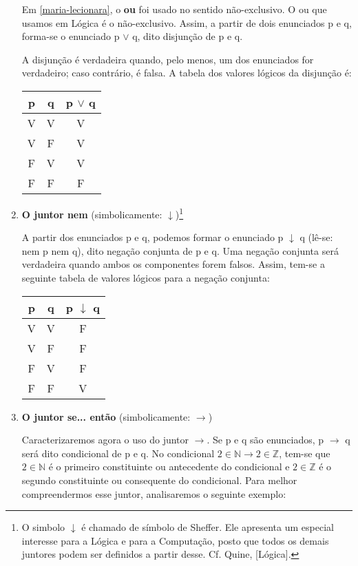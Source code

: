 \begin{enumerate}[label=\textbf{(\arabic*)}]
    Em \ref{maria-lecionara}, o \textbf{ou} foi usado no sentido não-exclusivo.
    O ou que usamos em Lógica é o não-exclusivo.
    Assim, a partir de dois enunciados p e q, forma-se o enunciado p $\lor$ q, dito disjunção de p e q.

    A disjunção é verdadeira quando, pelo menos, um dos enunciados for verdadeiro; caso contrário, é falsa.
    A tabela dos valores lógicos da disjunção é:

    \begin{center}
        \begin{tabular}{c c c}
            p & q & p $\lor$ q \\ \hline
            V & V & V \\
            V & F & V \\
            F & V & V \\
            F & F & F
        \end{tabular}
    \end{center}

    \pagebreak

    \item \textbf{O juntor nem} (simbolicamente: $\downarrow$)\footnote{O simbolo $\downarrow$ é chamado de  símbolo de Sheffer.
    Ele apresenta um especial interesse para a  Lógica e para a Computação, posto que todos os demais juntores podem ser definidos a partir desse. Cf. Quine, [Lógica].}

    A partir dos enunciados p e q, podemos formar o enunciado p $\downarrow$ q  (lê-se: nem p nem q), dito negação conjunta de p e q.
    Uma negação conjunta será verdadeira quando ambos os componentes forem falsos.
    Assim, tem-se a seguinte tabela de valores lógicos para a negação conjunta:

    \begin{center}
        \begin{tabular}{c c c}
            p & q & p $\downarrow$ q \\ \hline
            V & V & F \\
            V & F & F \\
            F & V & F \\
            F & F & V
        \end{tabular}
    \end{center}

    \item \textbf{O juntor se... então} (simbolicamente: $\to$)

    Caracterizaremos agora o uso do juntor $\to$.
    Se p e  q  são enunciados, p $\to$ q será dito condicional de p e q.
    No condicional $2 \in \mathbb{N} \to 2 \in \mathbb{Z}$, tem-se que $2 \in \mathbb{N}$ é o primeiro constituinte ou antecedente do condicional e $2 \in \mathbb{Z}$ é o segundo constituinte ou consequente do condicional.
    Para melhor compreendermos esse juntor, analisaremos o seguinte exemplo:


\end{enumerate}
